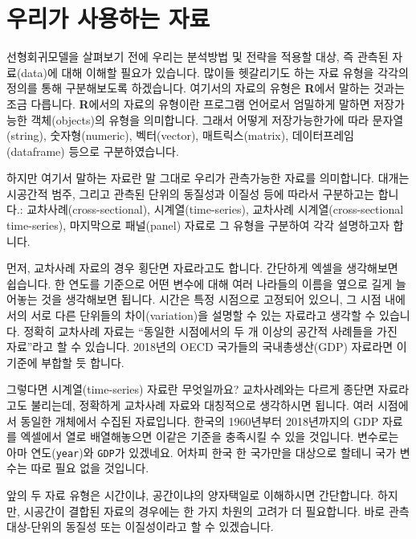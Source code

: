 \documentclass[
]{book}
\begin{document}
\hypertarget{uxc6b0uxb9acuxac00-uxc0acuxc6a9uxd558uxb294-uxc790uxb8cc}{%
\section{우리가 사용하는 자료}\label{uxc6b0uxb9acuxac00-uxc0acuxc6a9uxd558uxb294-uxc790uxb8cc}}

선형회귀모델을 살펴보기 전에 우리는 분석방법 및 전략을 적용할 대상, 즉 관측된 자료(data)에 대해 이해할 필요가 있습니다. 많이들 헷갈리기도 하는 자료 유형을 각각의 정의를 통해 구분해보도록 하겠습니다. 여기서의 자료의 유형은 \textbf{R}에서 말하는 것과는 조금 다릅니다. \textbf{R}에서의 자료의 유형이란 프로그램 언어로서 엄밀하게 말하면 저장가능한 객체(objects)의 유형을 의미합니다. 그래서 어떻게 저장가능한가에 따라 문자열(string), 숫자형(numeric), 벡터(vector), 매트릭스(matrix), 데이터프레임(dataframe) 등으로 구분하였습니다.

하지만 여기서 말하는 자료란 말 그대로 우리가 관측가능한 자료를 의미합니다. 대개는 시공간적 범주, 그리고 관측된 단위의 동질성과 이질성 등에 따라서 구분하고는 합니다.: 교차사례(cross-sectional), 시계열(time-series), 교차사례 시계열(cross-sectional time-series), 마지막으로 패널(panel) 자료로 그 유형을 구분하여 각각 설명하고자 합니다.

먼저, 교차사례 자료의 경우 횡단면 자료라고도 합니다. 간단하게 엑셀을 생각해보면 쉽습니다. 한 연도를 기준으로 어떤 변수에 대해 여러 나라들의 이름을 옆으로 길게 늘어놓는 것을 생각해보면 됩니다. 시간은 특정 시점으로 고정되어 있으니, 그 시점 내에서의 서로 다른 단위들의 차이(variation)을 설명할 수 있는 자료라고 생각할 수 있습니다. 정확히 교차사례 자료는 ``동일한 시점에서의 두 개 이상의 공간적 사례들을 가진 자료''라고 할 수 있습니다. 2018년의 OECD 국가들의 국내총생산(GDP) 자료라면 이 기준에 부합할 듯 합니다.

그렇다면 시계열(time-series) 자료란 무엇일까요? 교차사례와는 다르게 종단면 자료라고도 불리는데, 정확하게 교차사례 자료와 대칭적으로 생각하시면 됩니다. 여러 시점에서 동일한 개체에서 수집된 자료입니다. 한국의 1960년부터 2018년까지의 GDP 자료를 엑셀에서 열로 배열해놓으면 이같은 기준을 충족시킬 수 있을 것입니다. 변수로는 아마 연도(\texttt{year})와 \texttt{GDP}가 있겠네요. 어차피 한국 한 국가만을 대상으로 할테니 국가 변수는 따로 필요 없을 것입니다.

앞의 두 자료 유형은 시간이냐, 공간이냐의 양자택일로 이해하시면 간단합니다. 하지만, 시공간이 결합된 자료의 경우에는 한 가지 차원의 고려가 더 필요합니다. 바로 관측대상-단위의 동질성 또는 이질성이라고 할 수 있겠습니다.
\end{document}
